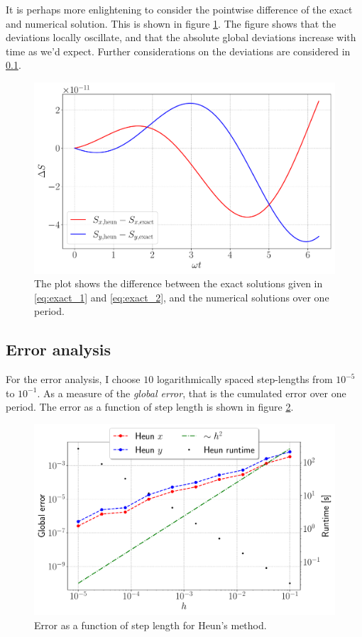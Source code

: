 It is perhaps more enlightening to consider the pointwise difference of the exact and numerical solution. This is shown in figure \ref{fig:comp_diff}. The figure shows that the deviations locally oscillate, and that the absolute global deviations increase with time as we'd expect. Further considerations on the deviations are considered in \ref{sec:error}.

\begin{figure}[htb]
	\centering
	\includegraphics[width=0.8\columnwidth]{../fig/comparison_diff.pdf}
	\caption{The plot shows the difference between the exact solutions given in \eqref{eq:exact_1} and \eqref{eq:exact_2}, and the numerical solutions over one period.}
	\label{fig:comp_diff}
\end{figure} 

\subsection{Error analysis}\label{sec:error}

For the error analysis, I choose $10$ logarithmically spaced step-lengths from $10^{-5}$ to $10^{-1}$. As a measure of the \textit{global error}, that is the cumulated error over one period. The error as a function of step length is shown in figure \ref{fig:err_heun}.

\begin{figure}[htb]
	\centering
	\includegraphics[width = 0.8\columnwidth]{../fig/err_heun.pdf}
	\caption{Error as a function of step length for Heun's method.}
	\label{fig:err_heun}
\end{figure}

